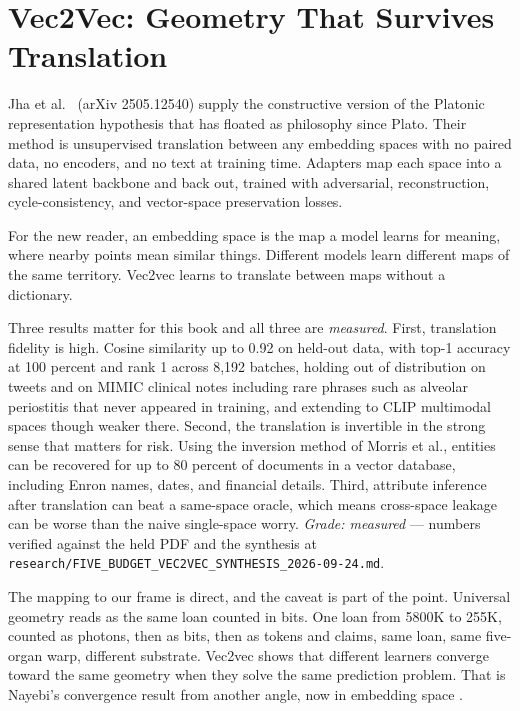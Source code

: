 \section{Vec2Vec: Geometry That Survives Translation}
\label{sec:ch09-vec2vec}

Jha et al.\ \cite{jha2025} (arXiv 2505.12540) supply the constructive version of the Platonic representation hypothesis that has floated as philosophy since Plato. Their method is unsupervised translation between any embedding spaces with no paired data, no encoders, and no text at training time. Adapters map each space into a shared latent backbone and back out, trained with adversarial, reconstruction, cycle-consistency, and vector-space preservation losses.

For the new reader, an embedding space is the map a model learns for meaning, where nearby points mean similar things. Different models learn different maps of the same territory. Vec2vec learns to translate between maps without a dictionary.

Three results matter for this book and all three are \textit{measured}. First, translation fidelity is high. Cosine similarity up to 0.92 on held-out data, with top-1 accuracy at 100 percent and rank 1 across 8,192 batches, holding out of distribution on tweets and on MIMIC clinical notes including rare phrases such as alveolar periostitis that never appeared in training, and extending to CLIP multimodal spaces though weaker there. Second, the translation is invertible in the strong sense that matters for risk. Using the inversion method of Morris et al., entities can be recovered for up to 80 percent of documents in a vector database, including Enron names, dates, and financial details. Third, attribute inference after translation can beat a same-space oracle, which means cross-space leakage can be worse than the naive single-space worry. \textit{Grade: measured} --- numbers verified against the held PDF and the synthesis at \texttt{research/FIVE\_BUDGET\_VEC2VEC\_SYNTHESIS\_2026-09-24.md}.

The mapping to our frame is direct, and the caveat is part of the point. Universal geometry reads as the same loan counted in bits. One loan from 5800K to 255K, counted as photons, then as bits, then as tokens and claims, same loan, same five-organ warp, different substrate. Vec2vec shows that different learners converge toward the same geometry when they solve the same prediction problem. That is Nayebi's convergence result from another angle, now in embedding space \citep{nayebi2026}.

